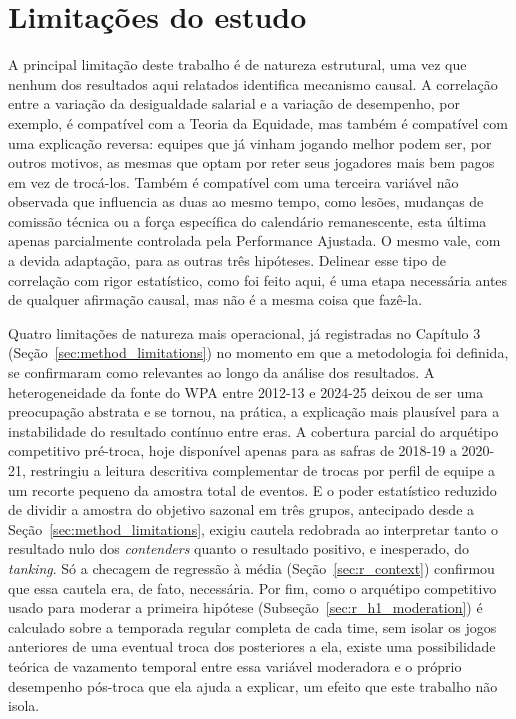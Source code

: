 \section{Limitações do estudo}
\label{sec:final_limitations}

A principal limitação deste trabalho é de natureza estrutural, uma vez que nenhum dos resultados aqui relatados identifica mecanismo causal. A correlação entre a variação da desigualdade salarial e a variação de desempenho, por exemplo, é compatível com a Teoria da Equidade, mas também é compatível com uma explicação reversa: equipes que já vinham jogando melhor podem ser, por outros motivos, as mesmas que optam por reter seus jogadores mais bem pagos em vez de trocá-los. Também é compatível com uma terceira variável não observada que influencia as duas ao mesmo tempo, como lesões, mudanças de comissão técnica ou a força específica do calendário remanescente, esta última apenas parcialmente controlada pela Performance Ajustada. O mesmo vale, com a devida adaptação, para as outras três hipóteses. Delinear esse tipo de correlação com rigor estatístico, como foi feito aqui, é uma etapa necessária antes de qualquer afirmação causal, mas não é a mesma coisa que fazê-la.

Quatro limitações de natureza mais operacional, já registradas no Capítulo 3 (Seção~\ref{sec:method_limitations}) no momento em que a metodologia foi definida, se confirmaram como relevantes ao longo da análise dos resultados. A heterogeneidade da fonte do WPA entre 2012-13 e 2024-25 deixou de ser uma preocupação abstrata e se tornou, na prática, a explicação mais plausível para a instabilidade do resultado contínuo entre eras. A cobertura parcial do arquétipo competitivo pré-troca, hoje disponível apenas para as safras de 2018-19 a 2020-21, restringiu a leitura descritiva complementar de trocas por perfil de equipe a um recorte pequeno da amostra total de eventos. E o poder estatístico reduzido de dividir a amostra do objetivo sazonal em três grupos, antecipado desde a Seção~\ref{sec:method_limitations}, exigiu cautela redobrada ao interpretar tanto o resultado nulo dos \textit{contenders} quanto o resultado positivo, e inesperado, do \textit{tanking}. Só a checagem de regressão à média (Seção~\ref{sec:r_context}) confirmou que essa cautela era, de fato, necessária. Por fim, como o arquétipo competitivo usado para moderar a primeira hipótese (Subseção~\ref{sec:r_h1_moderation}) é calculado sobre a temporada regular completa de cada time, sem isolar os jogos anteriores de uma eventual troca dos posteriores a ela, existe uma possibilidade teórica de vazamento temporal entre essa variável moderadora e o próprio desempenho pós-troca que ela ajuda a explicar, um efeito que este trabalho não isola.

